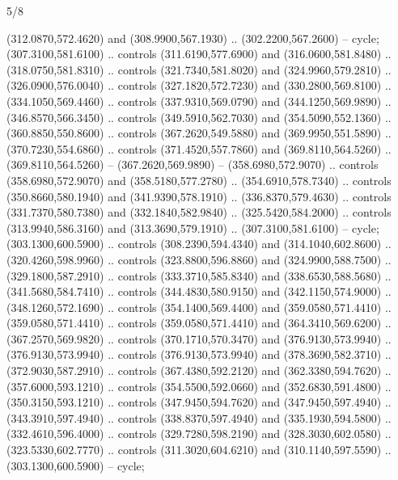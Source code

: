\begin{flagdescription}{5/8}
\begin{scope}[shift={(m)}]
\begin{scope}[scale=\flagwidth/220,y=0.1mm, x=0.1mm, yscale=-1,shift={(-596,-360)}]
\begin{scope}[draw=black,line join=round,line cap=round,line width=0.381\lw]
\begin{scope}[line width=0.534\lw,fill=green]
  (312.0870,572.4620) and (308.9900,567.1930) .. (302.2200,567.2600) -- cycle;
 (307.3100,581.6100) .. controls (311.6190,577.6900) and
  (316.0600,581.8480) .. (318.0750,581.8310) .. controls (321.7340,581.8020) and
  (324.9960,579.2810) .. (326.0900,576.0040) .. controls (327.1820,572.7230) and
  (330.2800,569.8100) .. (334.1050,569.4460) .. controls (337.9310,569.0790) and
  (344.1250,569.9890) .. (346.8570,566.3450) .. controls (349.5910,562.7030) and
  (354.5090,552.1360) .. (360.8850,550.8600) .. controls (367.2620,549.5880) and
  (369.9950,551.5890) .. (370.7230,554.6860) .. controls (371.4520,557.7860) and
  (369.8110,564.5260) .. (369.8110,564.5260) -- (367.2620,569.9890) --
  (358.6980,572.9070) .. controls (358.6980,572.9070) and (358.5180,577.2780) ..
  (354.6910,578.7340) .. controls (350.8660,580.1940) and (341.9390,578.1910) ..
  (336.8370,579.4630) .. controls (331.7370,580.7380) and (332.1840,582.9840) ..
  (325.5420,584.2000) .. controls (313.9940,586.3160) and (313.3690,579.1910) ..
  (307.3100,581.6100) -- cycle;
 (303.1300,600.5900) .. controls (308.2390,594.4340) and
  (314.1040,602.8600) .. (320.4260,598.9960) .. controls (323.8800,596.8860) and
  (324.9900,588.7500) .. (329.1800,587.2910) .. controls (333.3710,585.8340) and
  (338.6530,588.5680) .. (341.5680,584.7410) .. controls (344.4830,580.9150) and
  (342.1150,574.9000) .. (348.1260,572.1690) .. controls (354.1400,569.4400) and
  (359.0580,571.4410) .. (359.0580,571.4410) .. controls (359.0580,571.4410) and
  (364.3410,569.6200) .. (367.2570,569.9820) .. controls (370.1710,570.3470) and
  (376.9130,573.9940) .. (376.9130,573.9940) .. controls (376.9130,573.9940) and
  (378.3690,582.3710) .. (372.9030,587.2910) .. controls (367.4380,592.2120) and
  (362.3380,594.7620) .. (357.6000,593.1210) .. controls (354.5500,592.0660) and
  (352.6830,591.4800) .. (350.3150,593.1210) .. controls (347.9450,594.7620) and
  (347.9450,597.4940) .. (343.3910,597.4940) .. controls (338.8370,597.4940) and
  (335.1930,594.5800) .. (332.4610,596.4000) .. controls (329.7280,598.2190) and
  (328.3030,602.0580) .. (323.5330,602.7770) .. controls (311.3020,604.6210) and
  (310.1140,597.5590) .. (303.1300,600.5900) -- cycle;


\end{scope}
\end{scope}
\end{scope}
\end{scope}
\end{flagdescription}
